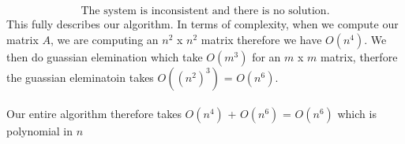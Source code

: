 \documentclass[11pt,a4paper]{article}
\begin{document}
\[
\text{The system is inconsistent and there is no solution.}
\]
This fully describes our algorithm. In terms of complexity, when we compute our matrix $A$, we are computing an $n^2$ x $n^2$ matrix therefore we have $O(n^4)$. We then do guassian elemination which take $O(m^3)$ for an $m$ x $m$ matrix, therfore the guassian eleminatoin takes $O((n^2)^3)$ = $O(n^6)$. \\\\
Our entire algorithm therefore takes $O(n^4)$ + $O(n^6)$ = $O(n^6)$ which is polynomial in $n$


\newpage
\end{document}
